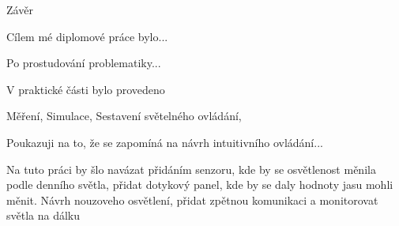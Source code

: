 \chap Závěr

Cílem mé diplomové práce bylo...

Po prostudování problematiky...

V praktické části bylo provedeno

Měření, Simulace, Sestavení světelného ovládání,

Poukazuji na to, že se zapomíná na návrh intuitivního ovládání...

Na tuto práci by šlo navázat přidáním senzoru, kde by se osvětlenost měnila podle denního světla, přidat dotykový panel, kde by se daly hodnoty
jasu mohli měnit. Návrh nouzoveho osvětlení, přidat zpětnou komunikaci a monitorovat světla na dálku



